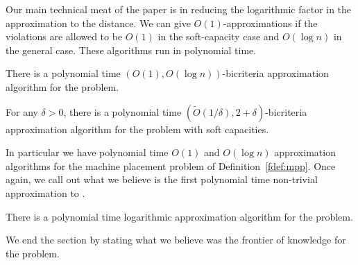 Our main technical meat of the paper is in reducing the logarithmic factor in the approximation to the distance.
We can give $O(1)$-approximations if the violations are allowed to be $O(1)$ in the soft-capacity case and $O(\log n)$ in the general case.
These algorithms run in polynomial time.
\begin{theorem}\label{fthm:2}
	There is a polynomial time  $(O(1),O(\log n))$-bicriteria approximation algorithm for the \mckc problem.
\end{theorem}
\begin{theorem}\label{fthm:2a}
	For any $\delta>0$, there is a polynomial time  $(\tilde{O}(1/\delta),2+\delta)$-bicriteria approximation algorithm for the \mckc problem with soft capacities.
\end{theorem}
In particular we have polynomial time $O(1)$ and $O(\log n)$ approximation algorithms for the machine placement problem of Definition~\ref{fdef:mpp}.
Once again, we call out what we believe is the first polynomial time non-trivial approximation to \cckp.
\begin{theorem}\label{fthm:cckp}
	There is a polynomial time logarithmic approximation algorithm for the \cckp problem.
\end{theorem}
We end the section by stating what we believe was the frontier of knowledge for the \cckp problem.
